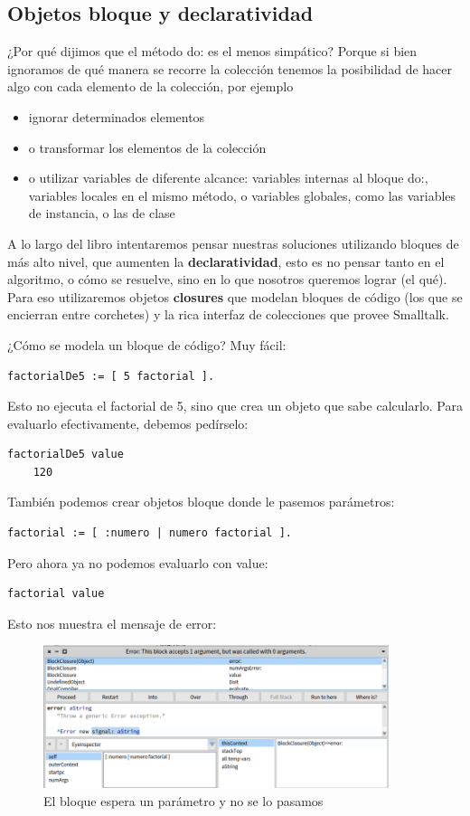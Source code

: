 \documentclass[a4paper,12pt]{book}
\begin{document}
\subsection{Objetos bloque y declaratividad}
¿Por qué dijimos que el método do: es el menos simpático? Porque si bien ignoramos de qué manera se recorre la
colección tenemos la posibilidad de hacer algo con cada elemento de la colección, por ejemplo
\begin{itemize}
 \item ignorar determinados elementos
 \item o transformar los elementos de la colección
 \item o utilizar variables de diferente alcance: variables internas al bloque do:, variables locales en el mismo
 método, o variables globales, como las variables de instancia, o las de clase
\end{itemize}
A lo largo del libro intentaremos pensar nuestras soluciones utilizando bloques de más alto nivel, que aumenten
la \textbf{declaratividad}, esto es no pensar tanto en el algoritmo, o cómo se resuelve, sino en lo que nosotros
queremos lograr (el qué). Para eso utilizaremos objetos \textbf{closures} que modelan bloques de código 
(los que se encierran entre corchetes) y la rica interfaz de colecciones que provee Smalltalk.

¿Cómo se modela un bloque de código? Muy fácil:
\begin{lstlisting}[frame=single]
factorialDe5 := [ 5 factorial ].
\end{lstlisting}

Esto no ejecuta el factorial de 5, sino que crea un objeto que sabe calcularlo. Para evaluarlo efectivamente, 
debemos pedírselo:
\begin{lstlisting}[frame=single]
factorialDe5 value
    120
\end{lstlisting}

También podemos crear objetos bloque donde le pasemos parámetros:
\begin{lstlisting}[frame=single]
factorial := [ :numero | numero factorial ].
\end{lstlisting}

Pero ahora ya no podemos evaluarlo con value:
\begin{lstlisting}[frame=single]
factorial value
\end{lstlisting}

Esto nos muestra el mensaje de error:

\begin{figure}[h!]
    \centering	
    \includegraphics[width=0.9\textwidth]{images/17_error_bloque.png}
    \caption{El bloque espera un parámetro y no se lo pasamos}
\end{figure}
\FloatBarrier
\end{document}
